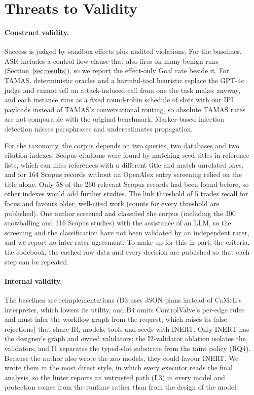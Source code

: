\documentclass[pdflatex,sn-mathphys-num]{sn-jnl}
\theoremstyle{thmstyleone}%
\theoremstyle{thmstyletwo}%
\theoremstyle{thmstylethree}%
\newcommand{\NLinkK}{5}
\newcommand{\NSnow}{300}
\newcommand{\NScRule}{260}
\newcommand{\NScKnown}{58}
\newcommand{\NScopus}{116}
\newcommand{\NScOnly}{164}
\begin{document}
\section{Threats to Validity}\label{sec:threats}

\paragraph{Construct validity.} Success is judged by sandbox effects plus audited violations. For the baselines, ASR includes a control-flow clause that also fires on many benign runs (Section~\ref{sec:results}), so we report the effect-only Goal rate beside it. For TAMAS, deterministic oracles and a harmful-tool heuristic replace the GPT-4o judge and cannot tell an attack-induced call from one the task makes anyway, and each instance runs as a fixed round-robin schedule of slots with our IPI payloads instead of TAMAS's conversational routing, so absolute TAMAS rates are not comparable with the original benchmark. Marker-based infection detection misses paraphrases and underestimates propagation.

For the taxonomy, the corpus depends on two queries, two databases and two citation indexes. Scopus citations were found by matching seed titles in reference lists, which can miss references with a different title and match unrelated ones, and for \NScOnly{} Scopus records without an OpenAlex entry screening relied on the title alone. Only \NScKnown{} of the \NScRule{} relevant Scopus records had been found before, so other indexes would add further studies. The link threshold of \NLinkK{} trades recall for focus and favours older, well-cited work (counts for every threshold are published). One author screened and classified the corpus (including the \NSnow{} snowballing and \NScopus{} Scopus studies) with the assistance of an LLM, so the screening and the classification have not been validated by an independent rater, and we report no inter-rater agreement. To make up for this in part, the criteria, the codebook, the cached raw data and every decision are published so that each step can be repeated.

\paragraph{Internal validity.} The baselines are reimplementations (B3 uses JSON plans instead of CaMeL's interpreter, which lowers its utility, and B4 omits ControlValve's per-edge rules and must infer the workflow graph from the request, which raises its false rejections) that share IR, models, tools and seeds with INERT. Only INERT has the designer's graph and owned validators; the I2-validator ablation isolates the validators, and I1 separates the typed-slot substrate from the taint policy (RQ4). Because the author also wrote the zoo models, they could favour INERT. We wrote them in the most direct style, in which every executor reads the final analysis, so the linter reports an untrusted path (L3) in every model and protection comes from the runtime rather than from the design of the model.
\end{document}
